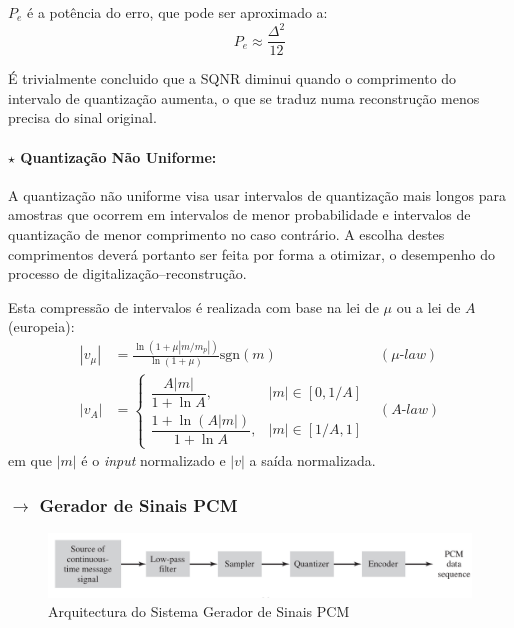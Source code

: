 \vspace{0.5em}
\noindent $P_e$ é a potência do erro, que pode ser aproximado a:
$$
    \boxed{P_e \approx \frac{\Delta^{2}}{12}} 
$$

\noindent É trivialmente concluido que a SQNR diminui quando o comprimento do intervalo de quantização aumenta, o que se traduz numa reconstrução menos precisa do sinal original.

\paragraph[3.3.1.3 Quantização Não Uniforme]{$\pmb{\star}$ Quantização Não Uniforme:}
\label{subsubsec:quantizationNU}
A quantização não uniforme visa usar intervalos de quantização mais longos para
amostras que ocorrem em intervalos de menor probabilidade e intervalos de quantização de
menor comprimento no caso contrário. A escolha destes comprimentos deverá portanto ser
feita por forma a otimizar, o desempenho do processo de digitalização–reconstrução.

\vspace{0.5em}
\noindent Esta compressão de intervalos é realizada com base na lei de $\mu$ ou a lei de $A$ (europeia):
\begin{align*}
    |v_\mu| &= \frac{\ln(1 + \mu|m/m_p|)}{\ln(1+\mu)}\text{sgn}(m) &(\mu\textit{-law})\\[6pt]
    |v_A| &= \begin{cases} 
        \dfrac{A |m|}{1 + \ln A}, & |m| \in [0, 1/A] \\[16pt]
        \dfrac{1+\ln(A|m|)}{1+\ln A}, & |m| \in [1/A, 1]
    \end{cases} &(A\textit{-law})
\end{align*}
em que $|m|$ é o \textit{input} normalizado e $|v|$ a saída normalizada.

\clearpage
\subsubsection[3.3.2 Gerador de Sinais PCM]{$\rightarrow$ Gerador de Sinais PCM}
\label{subsubsec:arquiteturaPCM}

\begin{figure}[H]
    \centering
    \includegraphics[width = 1\linewidth]{img/digital/PCM/PCM_ARQ.png}
    \caption{Arquitectura do Sistema Gerador de Sinais PCM}
    \label{fig:PCM_ARQ}
\end{figure}

